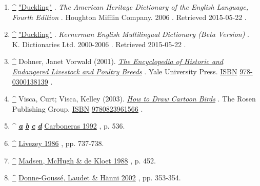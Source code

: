 \documentclass[11pt,a4paper]{article}
\begin{document}
\begin{enumerate}
\item \href{\#cite\_ref-1}{\textbf{\textasciicircum{}}} \href{http://dictionary.reference.com/browse/duckling}{"Duckling"} . \textit{The American Heritage Dictionary of the English Language, Fourth Edition} . Houghton Mifflin Company. 2006 . Retrieved 2015-05-22 .
\item \href{\#cite\_ref-2}{\textbf{\textasciicircum{}}} \href{http://dictionary.reference.com/browse/duckling}{"Duckling"} . \textit{Kernerman English Multilingual Dictionary (Beta Version)} . K. Dictionaries Ltd. 2000-2006 . Retrieved 2015-05-22 .
\item \href{\#cite\_ref-3}{\textbf{\textasciicircum{}}} Dohner, Janet Vorwald (2001). \href{https://books.google.com/books?id=WJCTL\_mC5w4C\&q=male+duck+is+called+a+drake+and+the+female+is+called+a+duck\&pg=PA457}{\textit{The Encyclopedia of Historic and Endangered Livestock and Poultry Breeds}} . Yale University Press. \href{/wiki/ISBN\_\%28identifier\%29}{ISBN} \href{/wiki/Special:BookSources/978-0300138139}{978-0300138139} .
\item \href{\#cite\_ref-4}{\textbf{\textasciicircum{}}} Visca, Curt; Visca, Kelley (2003). \href{https://books.google.com/books?id=VqSquCLNrZcC\&q=male+duck+is+called+a+drake+and+the+female+is+called+a+duck+\%28or+hen\%29\&pg=PA16}{\textit{How to Draw Cartoon Birds}} . The Rosen Publishing Group. \href{/wiki/ISBN\_\%28identifier\%29}{ISBN} \href{/wiki/Special:BookSources/9780823961566}{9780823961566} .
\item \textasciicircum{} \href{\#cite\_ref-FOOTNOTECarboneras1992536\_5-0}{\textit{\textbf{a}}} \href{\#cite\_ref-FOOTNOTECarboneras1992536\_5-1}{\textit{\textbf{b}}} \href{\#cite\_ref-FOOTNOTECarboneras1992536\_5-2}{\textit{\textbf{c}}} \href{\#cite\_ref-FOOTNOTECarboneras1992536\_5-3}{\textit{\textbf{d}}} \href{\#CITEREFCarboneras1992}{Carboneras 1992} , p. 536.
\item \href{\#cite\_ref-FOOTNOTELivezey1986737–738\_6-0}{\textbf{\textasciicircum{}}} \href{\#CITEREFLivezey1986}{Livezey 1986} , pp. 737-738.
\item \href{\#cite\_ref-FOOTNOTEMadsenMcHughde\_Kloet1988452\_7-0}{\textbf{\textasciicircum{}}} \href{\#CITEREFMadsenMcHughde\_Kloet1988}{Madsen, McHugh \& de Kloet 1988} , p. 452.
\item \href{\#cite\_ref-FOOTNOTEDonne-GousséLaudetHänni2002353–354\_8-0}{\textbf{\textasciicircum{}}} \href{\#CITEREFDonne-GousséLaudetHänni2002}{Donne-Goussé, Laudet \& Hänni 2002} , pp. 353-354.

\end{enumerate}
\end{document}
